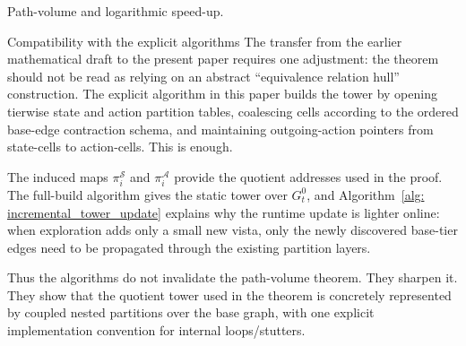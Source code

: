 \documentclass[11pt]{article}
\begin{document}
\begin{section}{Path-volume and logarithmic speed-up.}
\begin{subsection}{Compatibility with the explicit algorithms}
The transfer from the earlier mathematical draft to the present paper requires one adjustment: the theorem should not be read as relying on an abstract ``equivalence relation hull'' construction. The explicit algorithm in this paper builds the tower by opening tierwise state and action partition tables, coalescing cells according to the ordered base-edge contraction schema, and maintaining outgoing-action pointers from state-cells to action-cells. This is enough.

The induced maps
$
\pi_i^{\mathcal S}
$
and
$
\pi_i^{\mathcal A}
$
provide the quotient addresses used in the proof. The full-build algorithm gives the static tower over $G_t^0$, and Algorithm~\ref{alg: incremental_tower_update} explains why the runtime update is lighter online: when exploration adds only a small new vista, only the newly discovered base-tier edges need to be propagated through the existing partition layers.

Thus the algorithms do not invalidate the path-volume theorem. They sharpen it. They show that the quotient tower used in the theorem is concretely represented by coupled nested partitions over the base graph, with one explicit implementation convention for internal loops/stutters.

\end{subsection}
\end{section}





\end{document}
